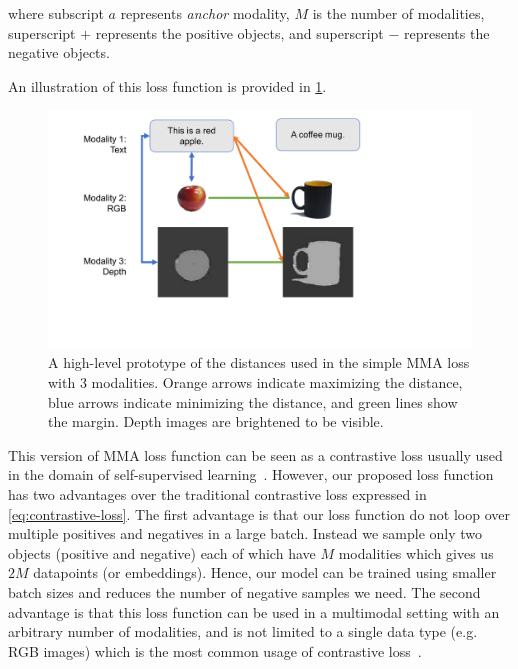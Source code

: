 where subscript $a$ represents \textit{anchor} modality, $M$ is the number of modalities, superscript $+$ represents the positive objects, and superscript $-$ represents the negative objects.

An illustration of this loss function is provided in \cref{fig:simple-mma-loss}.

\begin{figure}[tb]
\centering
\includegraphics[width=\columnwidth]{Figures/simple-MMA.pdf}
\caption{A high-level prototype of the distances used in the simple MMA loss with 3 modalities. Orange arrows indicate maximizing the distance, blue arrows indicate minimizing the distance, and green lines show the margin. Depth images are brightened to be visible. }
\label{fig:simple-mma-loss}
\end{figure}

This version of MMA loss function can be seen as a contrastive loss usually used in the domain of self-supervised learning~\cite{chen2020simple}. However, our proposed loss function has two advantages over the traditional contrastive loss expressed in \cref{eq:contrastive-loss}. The first advantage is that our loss function do not loop over multiple positives and negatives in a large batch. Instead we sample only two objects (positive and negative) each of which have $M$ modalities which gives us $2M$ datapoints (or embeddings). Hence, our model can be trained using smaller batch sizes and reduces the number of negative samples we need. The second advantage is that this loss function can be used in a multimodal setting with an arbitrary number of modalities, and is not limited to a single data type (e.g. RGB images) which is the most common usage of contrastive loss~\cite{chen2020simple, NEURIPS2020_supervised_contrastive}.


